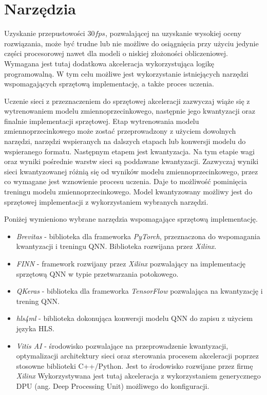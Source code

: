 \section{Narzędzia}
Uzyskanie przepustowości $30 fps$, pozwalającej na uzyskanie wysokiej oceny rozwiązania, może być trudne lub nie możliwe do osiągnięcia przy użyciu jedynie części procesorowej nawet dla modeli o niskiej złożoności obliczeniowej. 
Wymagana jest tutaj dodatkowa akceleracja wykorzystująca logikę programowalną. 
W tym celu możliwe jest wykorzystanie istniejących narzędzi wspomagających sprzętową implementację, a także proces uczenia. 

Uczenie sieci z przeznaczeniem do sprzętowej akceleracji zazwyczaj wiąże się z wytrenowaniem modelu zmiennoprzecinkowego, następnie jego kwantyzacji oraz finalnie implementacji sprzętowej.
Etap wytrenowania modelu zmiennoprzecinkowego może zostać przeprowadzony z użyciem dowolnych narzędzi, narzędzi wspieranych na dalszych etapach lub konwersji modelu do wspieranego formatu. 
Następnym etapem jest kwantyzacja. Na tym etapie wagi oraz wyniki pośrednie warstw sieci są poddawane kwantyzacji. 
Zazwyczaj wyniki sieci kwantyzowanej różnią się od wyników modelu zmiennoprzecinkowego, przez co wymagane jest wznowienie procesu uczenia.
Daje to możliwość pominięcia treningu modelu zmiennoprzecinkowego.
Model kwantyzowany możliwy jest do sprzętowej implementacji z wykorzystaniem wybranych narzędzi.

Poniżej wymieniono wybrane narzędzia wspomagające sprzętową implementację. 
\begin{itemize}
    \item \emph{Brevitas}\cite{brevitas} - biblioteka dla frameworka \emph{PyTorch}\cite{pytorch}, przeznaczona do wspomagania kwantyzacji i treningu QNN. Biblioteka rozwijana przez \emph{Xilinx}.
    
    \item \emph{FINN}\cite{finn} - framework rozwijany przez \emph{Xilinx} pozwalający na implementację sprzętową QNN w typie przetwarzania potokowego.
    
    \item \emph{QKeras}\cite{qkeras} - biblioteka dla frameworka \emph{TensorFlow}\cite{tf} pozwalająca na kwantyzację i trening QNN.
    \item \emph{hls4ml}\cite{hls4ml} - biblioteka dokonująca konwersji modelu QNN do zapisu z użyciem języka HLS. 
    
    \item \emph{Vitis AI}\cite{vitis_ai} - środowisko pozwalające na przeprowadzenie kwantyzacji, optymalizacji architektury sieci oraz sterowania procesem akceleracji poprzez stosowne biblioteki C++/Python. Jest to środowisko rozwijane przez firmę \emph{Xilinx}
    Wykorzystywana jest tutaj akceleracja z wykorzystaniem generycznego DPU (ang. Deep Processing Unit) możliwego do konfiguracji.
    
\end{itemize}


